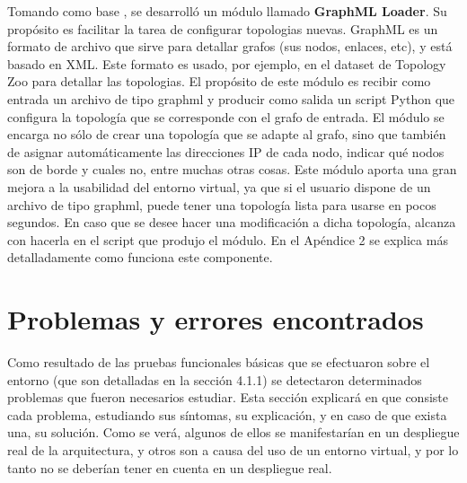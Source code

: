 Tomando como base \cite{auto-mininet}, se desarrolló un módulo llamado \textbf{GraphML Loader}. Su propósito es facilitar la tarea de configurar topologias nuevas. GraphML es un formato de archivo que sirve para detallar grafos (sus nodos, enlaces, etc), y está basado en XML. Este formato es usado, por ejemplo, en el dataset de Topology Zoo \cite{topology-zoo} para detallar las topologias. El propósito de este módulo es recibir como entrada un archivo de tipo graphml y producir como salida un script Python que configura la topología que se corresponde con el grafo de entrada. El módulo se encarga no sólo de crear una topología que se adapte al grafo, sino que también de asignar automáticamente las direcciones IP de cada nodo, indicar qué nodos son de borde y cuales no, entre muchas otras cosas. Este módulo aporta una gran mejora a la usabilidad del entorno virtual, ya que si el usuario dispone de un archivo de tipo graphml, puede tener una topología lista para usarse en pocos segundos. En caso que se desee hacer una modificación a dicha topología, alcanza con hacerla en el script que produjo el módulo. En el Apéndice 2 se explica más detalladamente como funciona este componente.


\section{Problemas y errores encontrados}
Como resultado de las pruebas funcionales básicas que se efectuaron sobre el entorno (que son detalladas en la sección 4.1.1) se detectaron determinados problemas que fueron necesarios estudiar. Esta sección explicará en que consiste cada problema, estudiando sus síntomas, su explicación, y en caso de que exista una, su solución. Como se verá, algunos de ellos se manifestarían en un despliegue real de la arquitectura, y otros son a causa del uso de un entorno virtual, y por lo tanto no se deberían tener en cuenta en un despliegue real.

